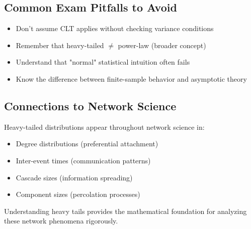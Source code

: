 \documentclass[11pt]{article}
\begin{document}
\subsection{Common Exam Pitfalls to Avoid}
\begin{itemize}
    \item Don't assume CLT applies without checking variance conditions
    \item Remember that heavy-tailed $\neq$ power-law (broader concept)
    \item Understand that "normal" statistical intuition often fails
    \item Know the difference between finite-sample behavior and asymptotic theory
\end{itemize}

\subsection{Connections to Network Science}
Heavy-tailed distributions appear throughout network science in:
\begin{itemize}
    \item Degree distributions (preferential attachment)
    \item Inter-event times (communication patterns)  
    \item Cascade sizes (information spreading)
    \item Component sizes (percolation processes)
\end{itemize}

Understanding heavy tails provides the mathematical foundation for analyzing these network phenomena rigorously.
\end{document}

